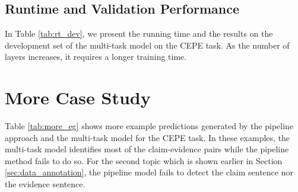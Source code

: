 \documentclass[11pt]{article}
\begin{document}
\subsection{Runtime and Validation Performance}

In Table \ref{tab:rt_dev}, we present the running time and the results on the development set of the multi-task model on the CEPE task.
As the number of layers increases, it requires a longer training time.


\begin{table}[H]
	\centering
{}
\caption{Runtime (RT) per epoch (minutes), the precision (P.), recall (R.) and F$_1$ on the development set of the multi-task model with differnt numbers of layers.}
	\label{tab:rt_dev}
\end{table}


\section{More Case Study}
\label{sec:more_eg}

Table \ref{tab:more_eg} shows more example predictions generated by the pipeline approach and the multi-task model for the CEPE task.
In these examples, the multi-task model identifies most of the claim-evidence pairs while the pipeline method fails to do so.
For the second topic which is shown earlier in Section \ref{sec:data_annotation}, the pipeline model fails to detect the claim sentence nor the evidence sentence.
\end{document}
